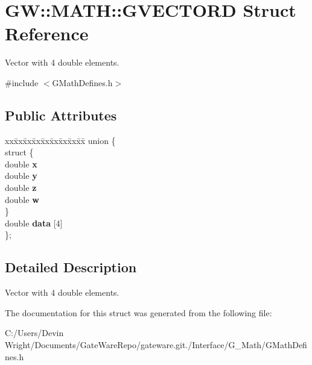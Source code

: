 \hypertarget{struct_g_w_1_1_m_a_t_h_1_1_g_v_e_c_t_o_r_d}{}\section{GW\+:\+:M\+A\+TH\+:\+:G\+V\+E\+C\+T\+O\+RD Struct Reference}
\label{struct_g_w_1_1_m_a_t_h_1_1_g_v_e_c_t_o_r_d}


Vector with 4 double elements.  




{\ttfamily \#include $<$G\+Math\+Defines.\+h$>$}

\subsection*{Public Attributes}
\begin{DoxyCompactItemize}
\item 
\mbox{\label{struct_g_w_1_1_m_a_t_h_1_1_g_v_e_c_t_o_r_d_a16fd4343a1d6a83698bc6bfaa968fd5f}} 
\begin{tabbing}
xx\=xx\=xx\=xx\=xx\=xx\=xx\=xx\=xx\=\kill
union \{\\
\mbox{\label{union_g_w_1_1_m_a_t_h_1_1_g_v_e_c_t_o_r_d_1_1_0D8_a17a8f0ae8f4361d5e49a0b49c723ba55}} 
\>struct \{\\
\>\>double {\bfseries x}\\
\>\>double {\bfseries y}\\
\>\>double {\bfseries z}\\
\>\>double {\bfseries w}\\
\>\} \\
\>double {\bfseries data} \mbox{[}4\mbox{]}\\
\}; \\

\end{tabbing}\end{DoxyCompactItemize}


\subsection{Detailed Description}
Vector with 4 double elements. 

The documentation for this struct was generated from the following file\+:\begin{DoxyCompactItemize}
\item 
C\+:/\+Users/\+Devin Wright/\+Documents/\+Gate\+Ware\+Repo/gateware.\+git./\+Interface/\+G\+\_\+\+Math/G\+Math\+Defines.\+h\end{DoxyCompactItemize}
